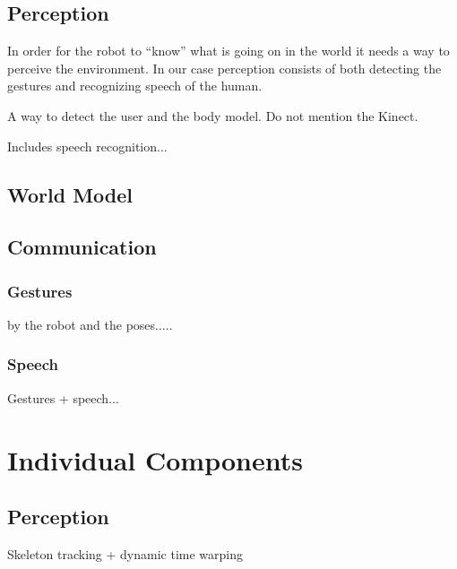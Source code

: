 \documentclass[10pt,a4paper,oneside]{scrartcl}
\begin{document}
\subsection{Perception}
In order for the robot to ``know'' what is going on in the world it needs a way to perceive the environment.
In our case perception consists of both detecting the gestures and recognizing speech of the human.


A way to detect the user and the body model.
Do not mention the Kinect.

Includes speech recognition...


\subsection{World Model}


\subsection{Communication}


\subsubsection{Gestures}
by the robot and the poses.....

\subsubsection{Speech}
Gestures + speech...



\section{Individual Components}

\subsection{Perception}
Skeleton tracking + dynamic time warping

\end{document}
